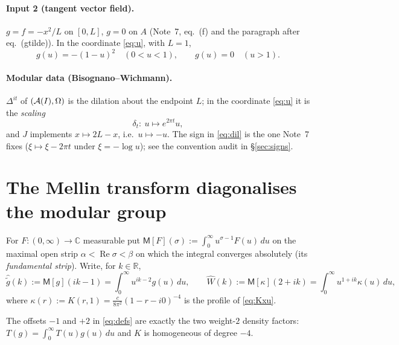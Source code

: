 \documentclass[11pt]{article}
\newcommand{\Wh}{\widehat W}
\newcommand{\gh}{\widehat{\widetilde g}}
\newcommand{\Om}{\Omega}
\newcommand{\Mel}{\mathsf M}
\begin{document}
\paragraph{Input 2 (tangent vector field).} $g=f=-x^2/L$ on $[0,L]$, $g=0$ on $A$
(Note~7, eq.~(f) and the paragraph after eq.~(gtilde)).  In the coordinate \eqref{eq:u}, with $L=1$,
\begin{equation}\label{eq:gu}
 g(u)=-(1-u)^2\quad (0<u<1),\qquad g(u)=0\quad(u>1).
\end{equation}

\paragraph{Modular data (Bisognano--Wichmann).} $\Delta^{it}$ of $(\cA(I),\Om)$ is the dilation about
the endpoint $L$; in the coordinate \eqref{eq:u} it is the \emph{scaling}
\begin{equation}\label{eq:dil}
 \delta_t:\ u\longmapsto e^{2\pi t}u ,
\end{equation}
and $J$ implements $x\mapsto2L-x$, i.e.\ $u\mapsto-u$.  The sign in \eqref{eq:dil} is the one
Note~7 fixes ($\xi\mapsto\xi-2\pi t$ under $\xi=-\log u$); see the convention audit in
\S\ref{sec:signs}.

\section{The Mellin transform diagonalises the modular group}\label{sec:mellin}

\begin{definition}\label{def:mellin}
For $F:(0,\infty)\to\mathbb C$ measurable put $\Mel[F](\sigma):=\int_0^\infty u^{\sigma-1}F(u)\,du$ on the
maximal open strip $\alpha<\operatorname{Re}\sigma<\beta$ on which the integral converges absolutely
(its \emph{fundamental strip}).  Write, for $k\in\mathbb R$,
\begin{equation}\label{eq:defs}
 \gh(k):=\Mel[g](ik-1)=\int_0^\infty u^{ik-2}g(u)\,du,\qquad
 \Wh(k):=\Mel[\kappa](2+ik)=\int_0^\infty u^{1+ik}\kappa(u)\,du,
\end{equation}
where $\kappa(r):=K(r,1)=\frac{c}{8\pi^2}(1-r-i0)^{-4}$ is the profile of \eqref{eq:Kxu}.
\end{definition}

The offsets $-1$ and $+2$ in \eqref{eq:defs} are exactly the two weight-$2$ density factors:
$T(g)=\int_0^\infty T(u)g(u)\,du$ and $K$ is homogeneous of degree $-4$.
\end{document}
